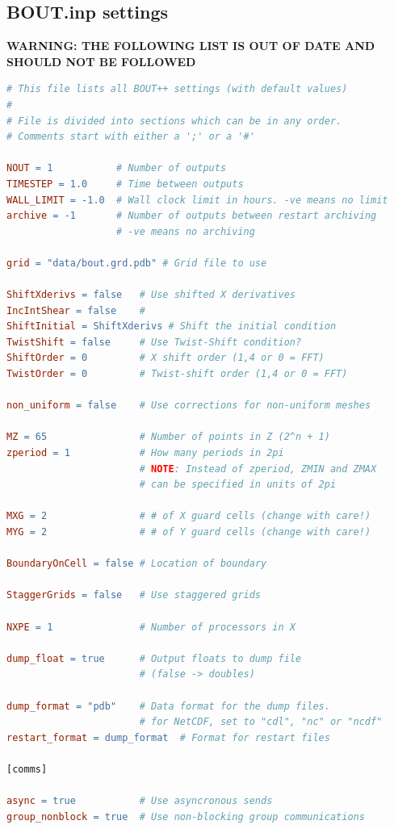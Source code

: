 \documentclass[12pt]{article}
\begin{document}
\subsection{BOUT.inp settings}
%
{\color{red} \textbf{WARNING: THE FOLLOWING LIST IS OUT OF DATE AND SHOULD NOT
BE FOLLOWED}}
%
\begin{lstlisting}[language=make,numbers=none]
# This file lists all BOUT++ settings (with default values)
#
# File is divided into sections which can be in any order.
# Comments start with either a ';' or a '#'

NOUT = 1           # Number of outputs
TIMESTEP = 1.0     # Time between outputs
WALL_LIMIT = -1.0  # Wall clock limit in hours. -ve means no limit
archive = -1       # Number of outputs between restart archiving
                   # -ve means no archiving

grid = "data/bout.grd.pdb" # Grid file to use

ShiftXderivs = false   # Use shifted X derivatives
IncIntShear = false    #
ShiftInitial = ShiftXderivs # Shift the initial condition
TwistShift = false     # Use Twist-Shift condition?
ShiftOrder = 0         # X shift order (1,4 or 0 = FFT)
TwistOrder = 0         # Twist-shift order (1,4 or 0 = FFT)

non_uniform = false    # Use corrections for non-uniform meshes

MZ = 65                # Number of points in Z (2^n + 1)
zperiod = 1            # How many periods in 2pi
                       # NOTE: Instead of zperiod, ZMIN and ZMAX
                       # can be specified in units of 2pi

MXG = 2                # # of X guard cells (change with care!)
MYG = 2                # # of Y guard cells (change with care!)

BoundaryOnCell = false # Location of boundary

StaggerGrids = false   # Use staggered grids

NXPE = 1               # Number of processors in X

dump_float = true      # Output floats to dump file
                       # (false -> doubles)

dump_format = "pdb"    # Data format for the dump files.
                       # for NetCDF, set to "cdl", "nc" or "ncdf"
restart_format = dump_format  # Format for restart files

[comms]

async = true           # Use asyncronous sends
group_nonblock = true  # Use non-blocking group communications


\end{lstlisting}
\end{document}
